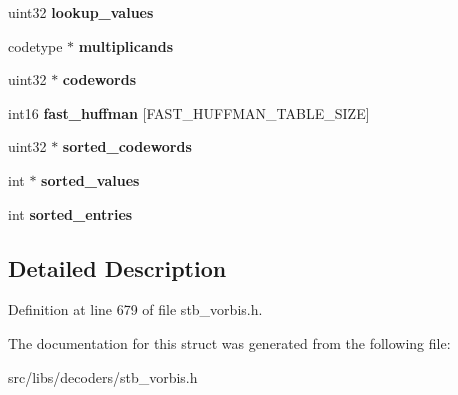 \begin{DoxyCompactItemize}
\item 
\hypertarget{structCodebook_abf078c998edfa8432087a5df96810c24}{uint32 {\bfseries lookup\-\_\-values}}\label{structCodebook_abf078c998edfa8432087a5df96810c24}

\item 
\hypertarget{structCodebook_a6d20dcddba93d3df6f6c9f3c1fbcf8fd}{codetype $\ast$ {\bfseries multiplicands}}\label{structCodebook_a6d20dcddba93d3df6f6c9f3c1fbcf8fd}

\item 
\hypertarget{structCodebook_a451075bbaced9845ae13a07f4696360a}{uint32 $\ast$ {\bfseries codewords}}\label{structCodebook_a451075bbaced9845ae13a07f4696360a}

\item 
\hypertarget{structCodebook_a5c6cba3f39227170f8f7806d0756b47f}{int16 {\bfseries fast\-\_\-huffman} \mbox{[}F\-A\-S\-T\-\_\-\-H\-U\-F\-F\-M\-A\-N\-\_\-\-T\-A\-B\-L\-E\-\_\-\-S\-I\-Z\-E\mbox{]}}\label{structCodebook_a5c6cba3f39227170f8f7806d0756b47f}

\item 
\hypertarget{structCodebook_a4823cd33a7bc61b11af9ce1c2b6e569d}{uint32 $\ast$ {\bfseries sorted\-\_\-codewords}}\label{structCodebook_a4823cd33a7bc61b11af9ce1c2b6e569d}

\item 
\hypertarget{structCodebook_afd7e12e75d4a9ca547dd19590c888238}{int $\ast$ {\bfseries sorted\-\_\-values}}\label{structCodebook_afd7e12e75d4a9ca547dd19590c888238}

\item 
\hypertarget{structCodebook_a1833700bf5f00815e1f0f8b3ebb77045}{int {\bfseries sorted\-\_\-entries}}\label{structCodebook_a1833700bf5f00815e1f0f8b3ebb77045}

\end{DoxyCompactItemize}


\subsection{Detailed Description}


Definition at line 679 of file stb\-\_\-vorbis.\-h.



The documentation for this struct was generated from the following file\-:\begin{DoxyCompactItemize}
\item 
src/libs/decoders/stb\-\_\-vorbis.\-h\end{DoxyCompactItemize}
